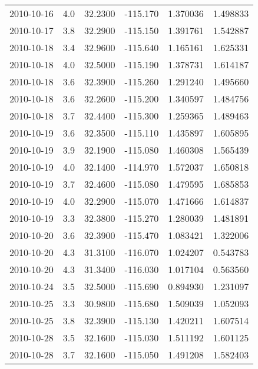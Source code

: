 \begin{tabular}{lrrrrr}
2010-10-16 &       4.0 &  32.2300 &  -115.170 &         1.370036 &         1.498833 \\
2010-10-17 &       3.8 &  32.2900 &  -115.150 &         1.391761 &         1.542887 \\
2010-10-18 &       3.4 &  32.9600 &  -115.640 &         1.165161 &         1.625331 \\
2010-10-18 &       4.0 &  32.5000 &  -115.190 &         1.378731 &         1.614187 \\
2010-10-18 &       3.6 &  32.3900 &  -115.260 &         1.291240 &         1.495660 \\
2010-10-18 &       3.6 &  32.2600 &  -115.200 &         1.340597 &         1.484756 \\
2010-10-18 &       3.7 &  32.4400 &  -115.300 &         1.259365 &         1.489463 \\
2010-10-19 &       3.6 &  32.3500 &  -115.110 &         1.435897 &         1.605895 \\
2010-10-19 &       3.9 &  32.1900 &  -115.080 &         1.460308 &         1.565439 \\
2010-10-19 &       4.0 &  32.1400 &  -114.970 &         1.572037 &         1.650818 \\
2010-10-19 &       3.7 &  32.4600 &  -115.080 &         1.479595 &         1.685853 \\
2010-10-19 &       4.0 &  32.2900 &  -115.070 &         1.471666 &         1.614837 \\
2010-10-19 &       3.3 &  32.3800 &  -115.270 &         1.280039 &         1.481891 \\
2010-10-20 &       3.6 &  32.3900 &  -115.470 &         1.083421 &         1.322006 \\
2010-10-20 &       4.3 &  31.3100 &  -116.070 &         1.024207 &         0.543783 \\
2010-10-20 &       4.3 &  31.3400 &  -116.030 &         1.017104 &         0.563560 \\
2010-10-24 &       3.5 &  32.5000 &  -115.690 &         0.894930 &         1.231097 \\
2010-10-25 &       3.3 &  30.9800 &  -115.680 &         1.509039 &         1.052093 \\
2010-10-25 &       3.8 &  32.3900 &  -115.130 &         1.420211 &         1.607514 \\
2010-10-28 &       3.5 &  32.1600 &  -115.030 &         1.511192 &         1.601125 \\
2010-10-28 &       3.7 &  32.1600 &  -115.050 &         1.491208 &         1.582403 \\

\end{tabular}
